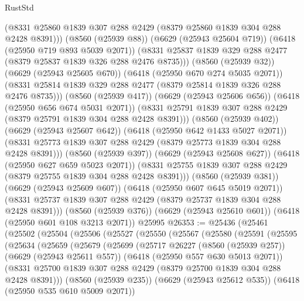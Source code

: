 \begin{lexlean}{RustStd}
\begin{coremodule}
                  (@8331 @25860 @1839 @307 @288 @2429 (@8379 @25860 @1839 @304 @288 @2428 @8391)))
                (@8560 (@25939 @88))
                (@6629 (@25943 @25604 @719))
                (@6418 (@25950 @719 @893 @5039 @2071))
                (@8331 @25837 @1839 @329 @288 @2477 (@8379 @25837 @1839 @326 @288 @2476 @8735)))
              (@8560 (@25939 @32))
              (@6629 (@25943 @25605 @670))
              (@6418 (@25950 @670 @274 @5035 @2071))
              (@8331 @25814 @1839 @329 @288 @2477 (@8379 @25814 @1839 @326 @288 @2476 @8735)))
            (@8560 (@25939 @417))
            (@6629 (@25943 @25606 @656))
            (@6418 (@25950 @656 @674 @5031 @2071))
            (@8331 @25791 @1839 @307 @288 @2429 (@8379 @25791 @1839 @304 @288 @2428 @8391)))
          (@8560 (@25939 @402))
          (@6629 (@25943 @25607 @642))
          (@6418 (@25950 @642 @1433 @5027 @2071))
          (@8331 @25773 @1839 @307 @288 @2429 (@8379 @25773 @1839 @304 @288 @2428 @8391)))
        (@8560 (@25939 @397))
        (@6629 (@25943 @25608 @627))
        (@6418 (@25950 @627 @659 @5023 @2071))
        (@8331 @25755 @1839 @307 @288 @2429 (@8379 @25755 @1839 @304 @288 @2428 @8391)))
      (@8560 (@25939 @381))
      (@6629 (@25943 @25609 @607))
      (@6418 (@25950 @607 @645 @5019 @2071))
      (@8331 @25737 @1839 @307 @288 @2429 (@8379 @25737 @1839 @304 @288 @2428 @8391)))
    (@8560 (@25939 @376))
    (@6629 (@25943 @25610 @601))
    (@6418 (@25950 @601 @108 @3213 @2071))
    @25995
@26353 := @25436
    (@25461
      (@25502
        (@25504
          (@25506
            (@25527
              (@25550
                (@25567
                  (@25580
                    (@25591
                      (@25595
                        (@25634
                          (@25659
                            (@25679
                              (@25699
                                (@25717
                                  @26227
                                  (@8560 (@25939 @257))
                                  (@6629 (@25943 @25611 @557))
                                  (@6418 (@25950 @557 @630 @5013 @2071))
                                  (@8331
                                    @25700
                                    @1839
                                    @307
                                    @288
                                    @2429
                                    (@8379 @25700 @1839 @304 @288 @2428 @8391)))
                                (@8560 (@25939 @235))
                                (@6629 (@25943 @25612 @535))
                                (@6418 (@25950 @535 @610 @5009 @2071))

\end{coremodule}
\end{lexlean}
